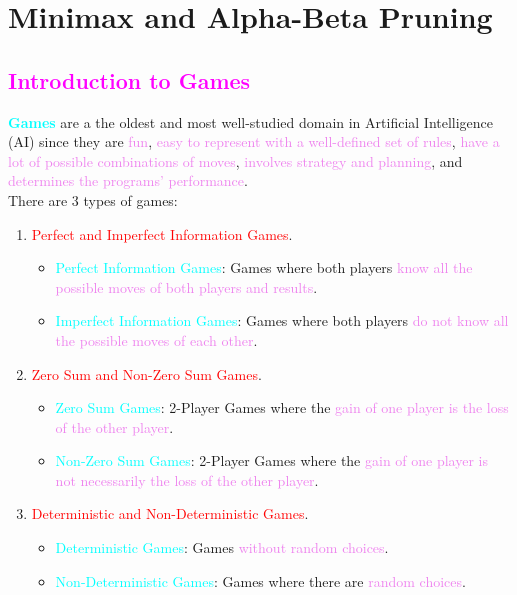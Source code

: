 \documentclass{book}
\begin{document}
\chapter{Minimax and Alpha-Beta Pruning}
\textcolor{magenta}{\section{\textbf{Introduction to Games}}}
\textcolor{cyan}{\textbf{Games}} are a the oldest and most well-studied domain in Artificial Intelligence (AI) since they are \textcolor{violet}{fun}, \textcolor{violet}{easy to represent with a well-defined set of rules}, \textcolor{violet}{have a lot of possible combinations of moves}, \textcolor{violet}{involves strategy and planning}, and \textcolor{violet}{determines the programs' performance}.\\
There are 3 types of games:
\begin{enumerate}
    \item \textcolor{red}{Perfect and Imperfect Information Games}.
    \begin{itemize}
        \item \textcolor{cyan}{Perfect Information Games}: Games where both players \textcolor{violet}{know all the possible moves of both players and results}.
        \item \textcolor{cyan}{Imperfect Information Games}: Games where both players \textcolor{violet}{do not know all the possible moves of each other}.
    \end{itemize}
    \item \textcolor{red}{Zero Sum and Non-Zero Sum Games}.
    \begin{itemize}
        \item \textcolor{cyan}{Zero Sum Games}: 2-Player Games where the \textcolor{violet}{gain of one player is the loss of the other player}.
        \item \textcolor{cyan}{Non-Zero Sum Games}: 2-Player Games where the \textcolor{violet}{gain of one player is not necessarily the loss of the other player}.
    \end{itemize}
    \item \textcolor{red}{Deterministic and Non-Deterministic Games}.
    \begin{itemize}
        \item \textcolor{cyan}{Deterministic Games}: Games \textcolor{violet}{without random choices}.
        \item \textcolor{cyan}{Non-Deterministic Games}: Games where there are \textcolor{violet}{random choices}.
    \end{itemize}
\end{enumerate}
\end{document}
